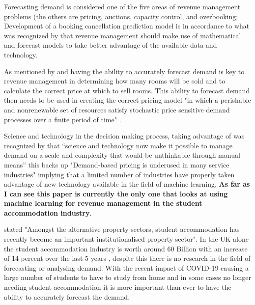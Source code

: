  Forecasting demand is considered one of the five areas of revenue management problems (the others are pricing, auctions, capacity control, and overbooking; \cite{Chiang2007AnResearch}  Development of a booking cancellation prediction model is in accordance to what was recognized by \cite{Chiang2007AnResearch} that revenue management should make use of mathematical and forecast models to take better advantage of the available data and technology.
 
As mentioned by \cite{RevenueWorldCat.org} and \cite{Weatherford2003AManagement} having the ability to accurately forecast demand is key to revenue management in determining how many rooms will be sold and to calculate the correct price at which to sell rooms. This ability to forecast demand then needs to be used in creating the correct pricing model "in which a perishable and nonrenewable set of resources satisfy stochastic price sensitive demand processes over a finite period of time" \cite{Bitran2003AnManagement}.

\vspace{5mm}

Science and technology in the decision making process, taking advantage of was recognized by \cite{Talluri2004TheManagement} that “science and technology now make it possible to manage demand on a scale and complexity that would be unthinkable through manual means”  this backs up "Demand-based pricing is underused in many service industries" \cite{Kimes2003HasAcceptable} implying that a limited number of industries have properly taken advantage of new technology available in the field of machine learning. \textbf{As far as I can see this paper is currently the only one that looks at using machine learning for revenue management in the student accommodation industry}. 

\vspace{5mm}

\cite{Newell2018TheSector} stated "Amongst the alternative property sectors, student accommodation has recently become an important institutionalised property sector". In the UK alone the student accommodation industry is worth around 60 Billion \cite{UKWakefield} with an increase of 14 percent over the last 5 years \cite{UKWakefield}, despite this there is no research in the field of forecasting or analysing demand. With the recent impact of COVID-19 causing a large number of students to have to study from home and in some cases no longer needing student accommodation it is more important than ever to have the ability to accurately forecast the demand. 



